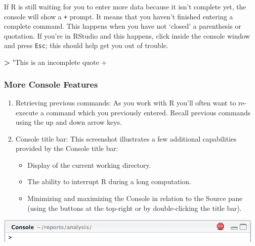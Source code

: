 \documentclass[]{book}
\newenvironment{Shaded}{\begin{snugshade}}{\end{snugshade}}
\newcommand{\StringTok}[1]{\textcolor[rgb]{0.31,0.60,0.02}{#1}}
\newcommand{\OperatorTok}[1]{\textcolor[rgb]{0.81,0.36,0.00}{\textbf{#1}}}
\providecommand{\tightlist}{%
  \setlength{\itemsep}{0pt}\setlength{\parskip}{0pt}}
\begin{document}
If R is still waiting for you to enter more data because it isn't
complete yet, the console will show a \texttt{+} prompt. It means that
you haven't finished entering a complete command. This happens when you
have not `closed' a parenthesis or quotation. If you're in RStudio and
this happens, click inside the console window and press \texttt{Esc};
this should help get you out of trouble.

\begin{Shaded}
\begin{Highlighting}[]
\OperatorTok{>}\StringTok{ "This is an incomplete quote}
\StringTok{+}
\end{Highlighting}
\end{Shaded}

\subsubsection*{More Console Features}\label{more-console-features}

\begin{enumerate}
\def\labelenumi{\arabic{enumi}.}
\item
  Retrieving previous commands: As you work with R you'll often want to
  re-execute a command which you previously entered. Recall previous
  commands using the up and down arrow keys.
\item
  Console title bar: This screenshot illustrates a few additional
  capabilities provided by the Console title bar:

  \begin{itemize}
  \tightlist
  \item
    Display of the current working directory.
  \item
    The ability to interrupt R during a long computation.
  \item
    Minimizing and maximizing the Console in relation to the Source pane
    (using the buttons at the top-right or by double-clicking the title
    bar).
  \end{itemize}
\end{enumerate}

\begin{center}\includegraphics[width=0.7\linewidth]{img/using_console_title_bar} \end{center}
\end{document}
